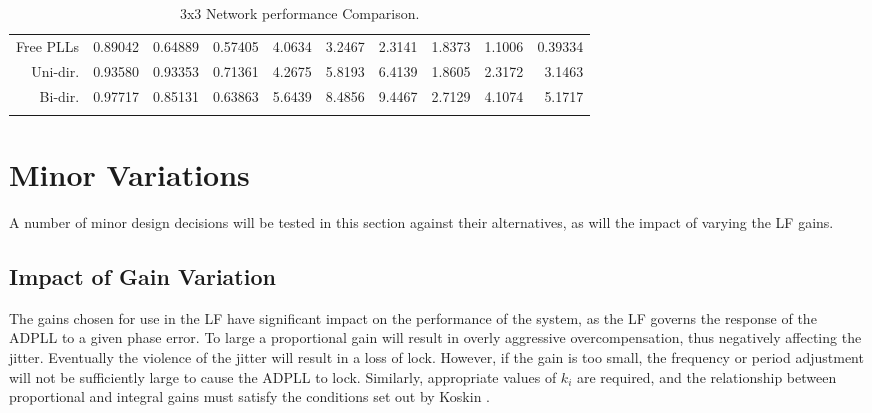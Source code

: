 \begin{table}[!ht]
\begin{center}
\begin{footnotesize}
\begin{tabular}{ll|r|r|r|r|r|r|r|r|r|}
                \multicolumn{2}{|r|}{Free PLLs} &0.89042 &0.64889 &0.57405    &4.0634 &3.2467 &2.3141    &1.8373&1.1006&0.39334 \T\\
                \multicolumn{2}{|r|}{Uni-dir.}  &0.93580 &0.93353 &0.71361    &4.2675 &5.8193 &6.4139    &1.8605&2.3172&3.1463  \T\\
                \multicolumn{2}{|r|}{Bi-dir.}   &0.97717 &0.85131 &0.63863    &5.6439 &8.4856 &9.4467    &2.7129&4.1074&5.1717  \T\\
                \hline
                \B                
            \end{tabular}
        \end{footnotesize}
        \caption{3x3 Network performance Comparison.}
        \label{table:3x3perf}
    \end{center}
    \vspace{-0.5cm}
\end{table}

\section{Minor Variations}\label{section:minor_variations}
A number of minor design decisions will be tested in this section against their alternatives, as will the impact of varying the \ac{LF} gains.

\subsection{Impact of Gain Variation}
The gains chosen for use in the \acl{LF} have significant impact on the performance of the system, as the \ac{LF} governs the response of the \ac{ADPLL} to a given phase error. To large a proportional gain will result in overly aggressive overcompensation, thus negatively affecting the jitter. Eventually the violence of the jitter will result in a loss of lock. However, if the gain is too small, the frequency or period adjustment will not be sufficiently large to cause the \ac{ADPLL} to lock. Similarly, appropriate values of $k_i$ are required, and the relationship between proportional and integral gains must satisfy the conditions set out by Koskin \cite{koskin2018generation}.

